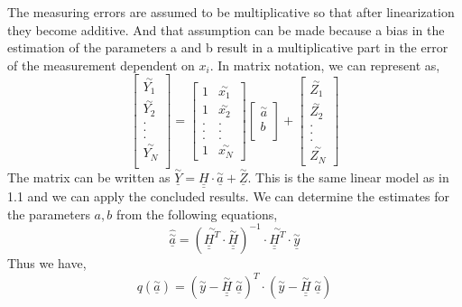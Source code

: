 \noindent The measuring errors are assumed to be multiplicative so that after linearization they become additive. And that assumption can be made because a bias in the estimation of the parameters a and b result in a multiplicative part in the error of the measurement dependent on $x_i$. In matrix notation, we can represent as,
\[
\begin{bmatrix}
\overset{\sim}{Y_1}\\
\overset{\sim}{Y_2}\\
.\\
.\\
.\\
\overset{\sim}{Y_N}\\
\end{bmatrix}
=
\begin{bmatrix}
1 & \overset{\sim}{x_1}\\
1 & \overset{\sim}{x_2}\\
. & .\\
. & .\\
. & .\\
1 & \overset{\sim}{x_N}
\end{bmatrix}
\begin{bmatrix}
\overset{\sim}{a}\\
b\\
\end{bmatrix}
+\begin{bmatrix}
\overset{\sim}{Z_1}\\
\overset{\sim}{Z_2}\\
.\\
.\\
.\\
\overset{\sim}{Z_N}
\end{bmatrix}
\]
\noindent The matrix can be written as $\underline{\overset{\sim}{Y}} = \underline{\underline{H}}\cdot\underline{\overset{\sim}{a}} + \underline{\overset{\sim}{Z}}$. This is the same linear model as in 1.1 and we can apply the concluded results.  We can determine the estimates for the parameters $a, b$ from the following equations,
$$\hat{\underline{\overset{\sim}{a}}} = (  \overset{\sim}{\underline{\underline{H}}^T}   \cdot \overset{\sim}{\underline{\underline{H}}})^{-1} \cdot  \overset{\sim}{\underline{\underline{H}}^T} \cdot \underline{\overset{\sim}{y}} $$
\noindent Thus we have,
$$ q(\overset{\sim}{\underline{a}}) = (\overset{\sim}{y} - \underline{\underline{\overset{\sim}{H}}}\; \underline{\overset{\sim}{a}})^T \cdot (\overset{\sim}{y} - \underline{\underline{\overset{\sim}{H}}}\; \underline{\overset{\sim}{a}})$$
